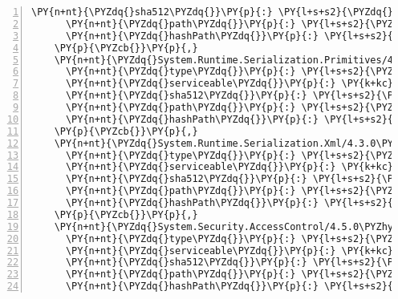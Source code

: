 \begin{Verbatim}[commandchars=\\\{\},numbers=left,firstnumber=1,stepnumber=1,numberblanklines=0]
      \PY{n+nt}{\PYZdq{}sha512\PYZdq{}}\PY{p}{:} \PY{l+s+s2}{\PYZdq{}sha512\PYZhy{}yMH+MfdzHjy17l2KESnPiF2dwq7T+xLnSJar7slyimAkUh/gTrS9/UQOtv7xarskJ2/XDSNvfLGOBQPjL7PaHQ==\PYZdq{}}\PY{p}{,}
      \PY{n+nt}{\PYZdq{}path\PYZdq{}}\PY{p}{:} \PY{l+s+s2}{\PYZdq{}system.runtime.numerics/4.3.0\PYZdq{}}\PY{p}{,}
      \PY{n+nt}{\PYZdq{}hashPath\PYZdq{}}\PY{p}{:} \PY{l+s+s2}{\PYZdq{}system.runtime.numerics.4.3.0.nupkg.sha512\PYZdq{}}
    \PY{p}{\PYZcb{}}\PY{p}{,}
    \PY{n+nt}{\PYZdq{}System.Runtime.Serialization.Primitives/4.3.0\PYZdq{}}\PY{p}{:} \PY{p}{\PYZob{}}
      \PY{n+nt}{\PYZdq{}type\PYZdq{}}\PY{p}{:} \PY{l+s+s2}{\PYZdq{}package\PYZdq{}}\PY{p}{,}
      \PY{n+nt}{\PYZdq{}serviceable\PYZdq{}}\PY{p}{:} \PY{k+kc}{true}\PY{p}{,}
      \PY{n+nt}{\PYZdq{}sha512\PYZdq{}}\PY{p}{:} \PY{l+s+s2}{\PYZdq{}sha512\PYZhy{}Wz+0KOukJGAlXjtKr+5Xpuxf8+c8739RI1C+A2BoQZT+wMCCoMDDdO8/4IRHfaVINqL78GO8dW8G2lW/e45Mcw==\PYZdq{}}\PY{p}{,}
      \PY{n+nt}{\PYZdq{}path\PYZdq{}}\PY{p}{:} \PY{l+s+s2}{\PYZdq{}system.runtime.serialization.primitives/4.3.0\PYZdq{}}\PY{p}{,}
      \PY{n+nt}{\PYZdq{}hashPath\PYZdq{}}\PY{p}{:} \PY{l+s+s2}{\PYZdq{}system.runtime.serialization.primitives.4.3.0.nupkg.sha512\PYZdq{}}
    \PY{p}{\PYZcb{}}\PY{p}{,}
    \PY{n+nt}{\PYZdq{}System.Runtime.Serialization.Xml/4.3.0\PYZdq{}}\PY{p}{:} \PY{p}{\PYZob{}}
      \PY{n+nt}{\PYZdq{}type\PYZdq{}}\PY{p}{:} \PY{l+s+s2}{\PYZdq{}package\PYZdq{}}\PY{p}{,}
      \PY{n+nt}{\PYZdq{}serviceable\PYZdq{}}\PY{p}{:} \PY{k+kc}{true}\PY{p}{,}
      \PY{n+nt}{\PYZdq{}sha512\PYZdq{}}\PY{p}{:} \PY{l+s+s2}{\PYZdq{}sha512\PYZhy{}nUQx/5OVgrqEba3+j7OdiofvVq9koWZAC7Z3xGI8IIViZqApWnZ5+lLcwYgTlbkobrl/Rat+Jb8GeD4WQESD2A==\PYZdq{}}\PY{p}{,}
      \PY{n+nt}{\PYZdq{}path\PYZdq{}}\PY{p}{:} \PY{l+s+s2}{\PYZdq{}system.runtime.serialization.xml/4.3.0\PYZdq{}}\PY{p}{,}
      \PY{n+nt}{\PYZdq{}hashPath\PYZdq{}}\PY{p}{:} \PY{l+s+s2}{\PYZdq{}system.runtime.serialization.xml.4.3.0.nupkg.sha512\PYZdq{}}
    \PY{p}{\PYZcb{}}\PY{p}{,}
    \PY{n+nt}{\PYZdq{}System.Security.AccessControl/4.5.0\PYZhy{}rc1\PYZdq{}}\PY{p}{:} \PY{p}{\PYZob{}}
      \PY{n+nt}{\PYZdq{}type\PYZdq{}}\PY{p}{:} \PY{l+s+s2}{\PYZdq{}package\PYZdq{}}\PY{p}{,}
      \PY{n+nt}{\PYZdq{}serviceable\PYZdq{}}\PY{p}{:} \PY{k+kc}{true}\PY{p}{,}
      \PY{n+nt}{\PYZdq{}sha512\PYZdq{}}\PY{p}{:} \PY{l+s+s2}{\PYZdq{}sha512\PYZhy{}bbmS09dlSaVCXUG1kyo7rHLnsoG9G0L8YPyt3mDKAAdetsXLb0Lx2zeTGCAymVi28voi4f+s4oUWuSE5KjyDVA==\PYZdq{}}\PY{p}{,}
      \PY{n+nt}{\PYZdq{}path\PYZdq{}}\PY{p}{:} \PY{l+s+s2}{\PYZdq{}system.security.accesscontrol/4.5.0\PYZhy{}rc1\PYZdq{}}\PY{p}{,}
      \PY{n+nt}{\PYZdq{}hashPath\PYZdq{}}\PY{p}{:} \PY{l+s+s2}{\PYZdq{}system.security.accesscontrol.4.5.0\PYZhy{}rc1.nupkg.sha512\PYZdq{}}

\end{Verbatim}
